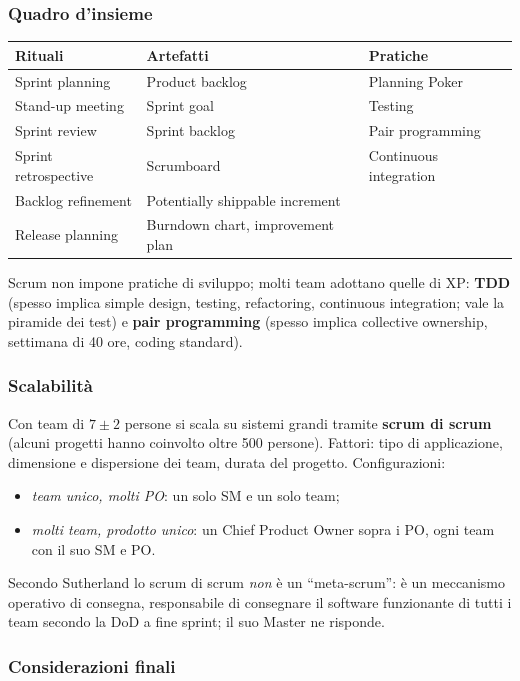 \documentclass[a4paper,12pt]{article}
\begin{document}
\subsubsection{Quadro d'insieme}
\begin{center}
\begin{tabular}{|p{4.6cm}|p{5cm}|p{5cm}|}
\hline
\textbf{Rituali} & \textbf{Artefatti} & \textbf{Pratiche}\\
\hline
Sprint planning & Product backlog & Planning Poker\\
Stand-up meeting & Sprint goal & Testing\\
Sprint review & Sprint backlog & Pair programming\\
Sprint retrospective & Scrumboard & Continuous integration\\
Backlog refinement & Potentially shippable increment & \\
Release planning & Burndown chart, improvement plan & \\
\hline
\end{tabular}
\end{center}

Scrum non impone pratiche di sviluppo; molti team adottano quelle di XP:
\textbf{TDD} (spesso implica simple design, testing, refactoring, continuous
integration; vale la piramide dei test) e \textbf{pair programming} (spesso implica
collective ownership, settimana di 40 ore, coding standard).

\subsubsection{Scalabilità}
Con team di $7\pm2$ persone si scala su sistemi grandi tramite \textbf{scrum di scrum}
(alcuni progetti hanno coinvolto oltre 500 persone). Fattori: tipo di applicazione,
dimensione e dispersione dei team, durata del progetto. Configurazioni:
\begin{itemize}
  \item \emph{team unico, molti PO}: un solo SM e un solo team;
  \item \emph{molti team, prodotto unico}: un Chief Product Owner sopra i PO, ogni team
        con il suo SM e PO.
\end{itemize}
Secondo Sutherland lo scrum di scrum \emph{non} è un ``meta-scrum'': è un meccanismo
operativo di consegna, responsabile di consegnare il software funzionante di tutti i team
secondo la DoD a fine sprint; il suo Master ne risponde.

\subsubsection{Considerazioni finali}
\end{document}
